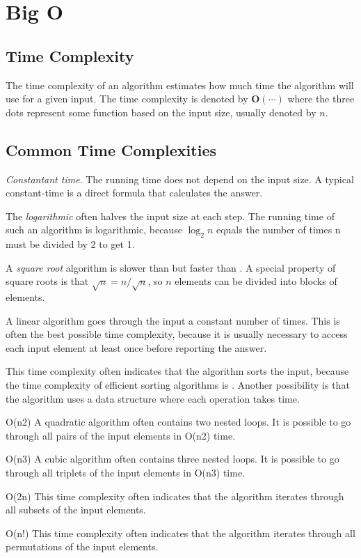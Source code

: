 \section{Big O}
\subsection*{Time Complexity}
The time complexity of an algorithm estimates how much time the algorithm will use for a given input. The time complexity is denoted by $\boldsymbol{O(\cdots)}$ where the three dots represent some function based on the input size, usually denoted by $n$.

\subsection*{Common Time Complexities}

\par {} \emph{Constantant time}. The running time does not depend on the input size. A typical constant-time is a direct formula that calculates the answer.

\par {} The \emph{logarithmic} often halves the input size at each step. The running time of such an algorithm is logarithmic, because $\log_2 n$ equals the number of times n must be divided by 2 to get 1.

\par {} A \emph{square root} algorithm is slower than  but faster than . A special property of square roots is that $\sqrt n = n/\sqrt n$, so $n$ elements can be divided into  blocks of  elements.

\par {} A linear algorithm goes through the input a constant number of times. This is often the best possible time complexity, because it is usually necessary to access each input element at least once before reporting the answer.

\par {} This time complexity often indicates that the algorithm sorts the input, because the time complexity of efficient sorting algorithms is . Another possibility is that the algorithm uses a data structure where each operation takes  time.

O(n2) A quadratic algorithm often contains two nested loops. It is possible to go through all pairs of the input elements in O(n2) time.

O(n3) A cubic algorithm often contains three nested loops. It is possible to go through all triplets of the input elements in O(n3) time.

O(2n) This time complexity often indicates that the algorithm iterates through all subsets of the input elements. %

O(n!) This time complexity often indicates that the algorithm iterates through all permutations of the input elements. %